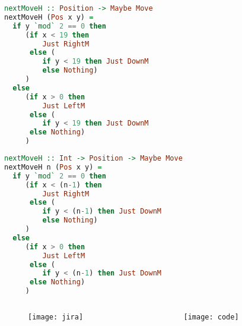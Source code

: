 \documentclass[10pt]{beamer}
\begin{document}
\begin{frame}[fragile]
\begin{lstlisting}[language=haskell, basicstyle=\ttfamily]
nextMoveH :: Position -> Maybe Move
nextMoveH (Pos x y) =
  if y `mod` 2 == 0 then
     (if x < 19 then
         Just RightM
      else (
         if y < 19 then Just DownM
         else Nothing)
     )
  else
     (if x > 0 then
         Just LeftM
      else (
         if y < 19 then Just DownM
      else Nothing)
     )
  \end{lstlisting}
\end{frame}
\begin{frame}[fragile]
\begin{lstlisting}[language=haskell, basicstyle=\ttfamily]
nextMoveH :: Int -> Position -> Maybe Move
nextMoveH n (Pos x y) =
  if y `mod` 2 == 0 then
     (if x < (n-1) then
         Just RightM
      else (
         if y < (n-1) then Just DownM
         else Nothing)
     )
  else
     (if x > 0 then
         Just LeftM
      else (
         if y < (n-1) then Just DownM
      else Nothing)
     )
  \end{lstlisting}
\end{frame}
\begin{frame}[fragile]
  \begin{columns}%
\begin{column}{0.5\textwidth}
  \begin{figure}
    \texttt{[image: jira]}
  \end{figure}
        \end{column}
            \vrule{}
        \begin{column}{0.5\textwidth}
  \begin{figure}
    \texttt{[image: code]}
  \end{figure}
        \end{column}
   \end{columns}
\end{frame}
\end{document}
